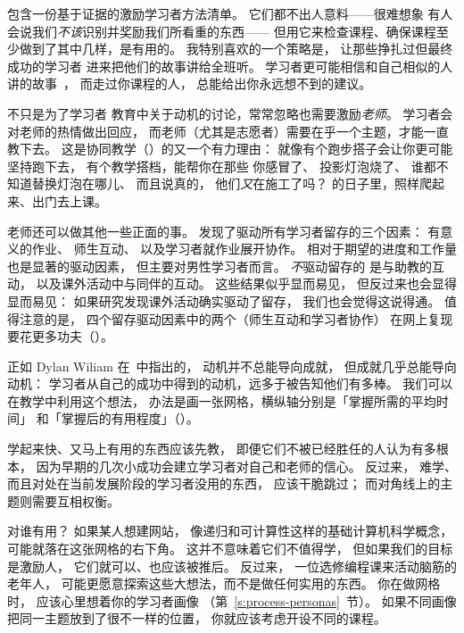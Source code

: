 \cite{Ambr2010}包含一份基于证据的激励学习者方法清单。
它们都不出人意料——很难想象
有人会说我们\emph{不该}识别并奖励我们所看重的东西——
但用它来检查课程、确保课程至少做到了其中几样，是有用的。
我特别喜欢的一个策略是，
让那些挣扎过但最终成功的学习者
进来把他们的故事讲给全班听。
学习者更可能相信和自己相似的人讲的故事~\cite{Mill2016a}，
而走过你课程的人，
总能给出你永远想不到的建议。

\begin{aside}{不只是为了学习者}
  教育中关于动机的讨论，常常忽略也需要激励\emph{老师}。
  学习者会对老师的热情做出回应，
  而老师（尤其是志愿者）需要在乎一个主题，才能一直教下去。
  这是协同教学（）的又一个有力理由：
  就像有个跑步搭子会让你更可能坚持跑下去，
  有个教学搭档，能帮你在那些
  你感冒了、
  投影灯泡烧了、
  谁都不知道替换灯泡在哪儿、
  而且说真的，
  他们\emph{又}在施工了吗？
  的日子里，照样爬起来、出门去上课。
\end{aside}

老师还可以做其他一些正面的事。
\cite{Bark2014}发现了驱动所有学习者留存的三个因素：
有意义的作业、
师生互动、
以及学习者就作业展开协作。
相对于期望的进度和工作量也是显著的驱动因素，
但主要对男性学习者而言。
\emph{不}驱动留存的
是与助教的互动，
以及课外活动中与同伴的互动。
这些结果似乎显而易见，
但反过来也会显得显而易见：
如果研究发现课外活动确实驱动了留存，
我们也会觉得这说得通。
值得注意的是，
四个留存驱动因素中的两个（师生互动和学习者协作）
在网上复现要花更多功夫（）。


正如 Dylan Wiliam 在~\cite{Hend2017}中指出的，
动机并不总能导向成就，
但成就几乎总能导向动机：
学习者从自己的成功中得到的动机，远多于被告知他们有多棒。
我们可以在教学中利用这个想法，
办法是画一张网格，横纵轴分别是「掌握所需的平均时间」
和「掌握后的有用程度」（）。


学起来快、又马上有用的东西应该先教，
即便它们不被已经胜任的人认为有多根本，
因为早期的几次小成功会建立学习者对自己和老师的信心。
反过来，
难学、而且对处在当前发展阶段的学习者没用的东西，
应该干脆跳过；
而对角线上的主题则需要互相权衡。

\newpage
\begin{aside}{对谁有用？}
  如果某人想建网站，
  像递归和可计算性这样的基础计算机科学概念，
  可能就落在这张网格的右下角。
  这并不意味着它们不值得学，
  但如果我们的目标是激励人，
  它们就可以、也应该被推后。
  反过来，
  一位选修编程课来活动脑筋的老年人，
  可能更愿意探索这些大想法，而不是做任何实用的东西。
  你在做网格时，
  应该心里想着你的学习者画像
  （第~\ref{s:process-personas}~节）。
  如果不同画像把同一主题放到了很不一样的位置，
  你就应该考虑开设不同的课程。
\end{aside}

